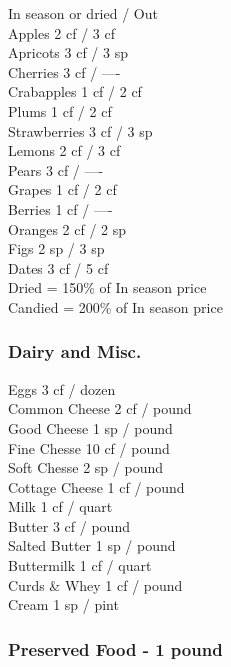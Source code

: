 \begin{multicols}{3}
{				\hfill In season or dried / Out \\
Apples				\hfill 2 cf / 3 cf \\
Apricots			\hfill 3 cf / 3 sp \\
Cherries			\hfill 3 cf / ---- \\
Crabapples			\hfill 1 cf / 2 cf \\
Plums				\hfill 1 cf / 2 cf \\
Strawberries			\hfill 3 cf / 3 sp \\
Lemons				\hfill 2 cf / 3 cf \\
Pears				\hfill 3 cf / ---- \\
Grapes				\hfill 1 cf / 2 cf \\
Berries				\hfill 1 cf / ---- \\
Oranges				\hfill 2 cf / 2 sp \\
Figs				\hfill 2 sp / 3 sp \\
Dates				\hfill 3 cf / 5 cf \\
Dried = 150\% of In season price \\
Candied = 200\% of In season price \\


\subsubsection{Dairy and Misc.}

Eggs				\hfill 3 cf / dozen \\
Common Cheese				\hfill 2 cf / pound \\
Good Cheese				\hfill 1 sp / pound \\
Fine Chesse				\hfill 10 cf / pound \\
Soft Chesse				\hfill 2 sp / pound \\
Cottage Cheese				\hfill 1 cf / pound \\
Milk				\hfill 1 cf / quart \\
Butter				\hfill 3 cf / pound \\
Salted Butter				\hfill 1 sp / pound \\
Buttermilk				\hfill 1 cf / quart \\
Curds \& Whey				\hfill 1 cf / pound \\
Cream				\hfill 1 sp / pint \\


\subsubsection{Preserved Food - 1 pound}

}
\end{multicols}
